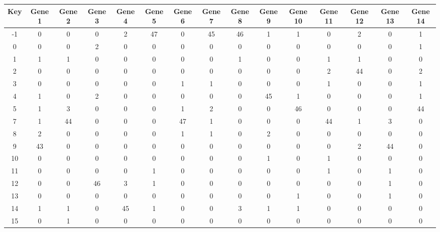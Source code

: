 \begin{tabular}{|c|c|c|c|c|c|c|c|c|c|c|c|c|c|c|}
\hline
Key & Gene 1 & Gene 2 & Gene 3 & Gene 4 & Gene 5 & Gene 6 & Gene 7 & Gene 8 & Gene 9 & Gene 10 & Gene 11 & Gene 12 & Gene 13 & Gene 14 \\
\hline
-1 & 0 & 0 & 0 & 2 & 47 & 0 & 45 & 46 & 1 & 1 & 0 & 2 & 0 & 1 \\
0 & 0 & 0 & 2 & 0 & 0 & 0 & 0 & 0 & 0 & 0 & 0 & 0 & 0 & 1 \\
1 & 1 & 1 & 0 & 0 & 0 & 0 & 0 & 1 & 0 & 0 & 1 & 1 & 0 & 0 \\
2 & 0 & 0 & 0 & 0 & 0 & 0 & 0 & 0 & 0 & 0 & 2 & 44 & 0 & 2 \\
3 & 0 & 0 & 0 & 0 & 0 & 1 & 1 & 0 & 0 & 0 & 1 & 0 & 0 & 1 \\
4 & 1 & 0 & 2 & 0 & 0 & 0 & 0 & 0 & 45 & 1 & 0 & 0 & 0 & 1 \\
5 & 1 & 3 & 0 & 0 & 0 & 1 & 2 & 0 & 0 & 46 & 0 & 0 & 0 & 44 \\
7 & 1 & 44 & 0 & 0 & 0 & 47 & 1 & 0 & 0 & 0 & 44 & 1 & 3 & 0 \\
8 & 2 & 0 & 0 & 0 & 0 & 1 & 1 & 0 & 2 & 0 & 0 & 0 & 0 & 0 \\
9 & 43 & 0 & 0 & 0 & 0 & 0 & 0 & 0 & 0 & 0 & 0 & 2 & 44 & 0 \\
10 & 0 & 0 & 0 & 0 & 0 & 0 & 0 & 0 & 1 & 0 & 1 & 0 & 0 & 0 \\
11 & 0 & 0 & 0 & 0 & 1 & 0 & 0 & 0 & 0 & 0 & 1 & 0 & 1 & 0 \\
12 & 0 & 0 & 46 & 3 & 1 & 0 & 0 & 0 & 0 & 0 & 0 & 0 & 1 & 0 \\
13 & 0 & 0 & 0 & 0 & 0 & 0 & 0 & 0 & 0 & 1 & 0 & 0 & 1 & 0 \\
14 & 1 & 1 & 0 & 45 & 1 & 0 & 0 & 3 & 1 & 1 & 0 & 0 & 0 & 0 \\
15 & 0 & 1 & 0 & 0 & 0 & 0 & 0 & 0 & 0 & 0 & 0 & 0 & 0 & 0 \\
\hline
\end{tabular}